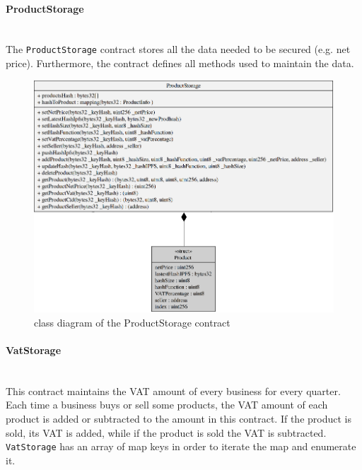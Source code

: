 \paragraph{ProductStorage}\mbox{}\\

\noindent The \texttt{ProductStorage} contract stores all the data needed to be secured (e.g. net price). Furthermore, the contract defines all methods used to maintain the data. 
\begin{figure}[H]
	\centering
	\includegraphics[scale=0.45]{res/images/solidity/productstorage.png}
	\caption{class diagram of the ProductStorage contract}
\end{figure}
\pagebreak
\paragraph{VatStorage}\mbox{}\\
This contract maintains the VAT amount of every business for every quarter. Each time a business buys or sell some products, the VAT amount of each product is added or subtracted to the amount in this contract. If the product is sold, its VAT is added, while if the product is sold the VAT is subtracted. \\
\texttt{VatStorage} has an array of map keys in order to iterate the map and enumerate it. 

